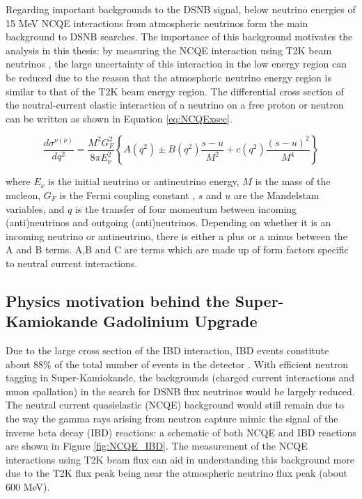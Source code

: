 Regarding important backgrounds to the DSNB signal, below neutrino energies of 15 MeV NCQE interactions from atmospheric neutrinos form the main background to DSNB searches. The importance of this background motivates the analysis in this thesis: by measuring the NCQE interaction using T2K beam neutrinos \cite{abe2021diffuse}, the large uncertainty of this interaction in the low energy region can be reduced due to the reason that the atmospheric neutrino energy region is similar to that of the T2K beam energy region. The differential cross section of the neutral-current elastic interaction of a neutrino on a free proton or neutron can be written as shown in Equation \ref{eq:NCQExsec}. 

\begin{equation}
\frac{d \sigma^{\nu(\bar{\nu})}}{d q^{2}}=\frac{M^{2} G_{F}^{2}}{8 \pi E_{\nu}^{2}}\left\{A\left(q^{2}\right) \pm B\left(q^{2}\right) \frac{s-u}{M^{2}}+c\left(q^{2}\right) \frac{(s-u)^{2}}{M^{4}}\right\}
\label{eq:NCQExsec}
\end{equation}
    
where $E_{\nu}$ is the initial neutrino or antineutrino energy, $M$ is the mass of the nucleon, $G_{F}$ is the Fermi coupling constant \cite{van2000precise}, $s$ and $u$ are the Mandelstam variables, and $q$ is the transfer of four momentum between incoming (anti)neutrinos and outgoing (anti)neutrinos. Depending on whether it is an incoming neutrino or antineutrino, there is either a plus or a minus between the A and B terms. A,B and C are terms which are made up of form factors specific to neutral current interactions.


\subsection{Physics motivation behind the Super-Kamiokande Gadolinium Upgrade}

Due to the large cross section of the IBD interaction, IBD events constitute about 88\% of the total number of events in the detector \cite{marti_evaluation_2020}. With efficient neutron tagging in Super-Kamiokande, the backgrounds (charged current interactions and muon spallation) in the search for DSNB flux neutrinos would be largely reduced. The neutral current quasielastic (NCQE) background would still remain due to the way the gamma rays arising from neutron capture mimic the signal of the inverse beta decay (IBD) reactions: a schematic of both NCQE and IBD reactions are shown in Figure \ref{fig:NCQE_IBD}. The measurement of the NCQE interactions using T2K beam flux can aid in understanding this background more due to the T2K flux peak being near the atmospheric neutrino flux peak (about 600 MeV). 



